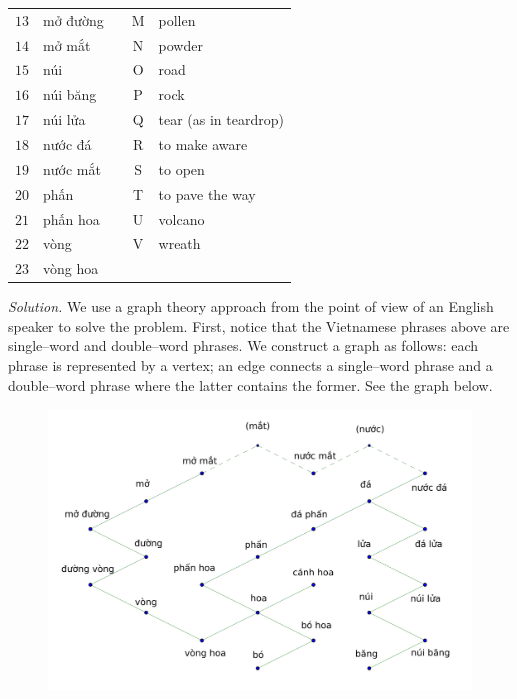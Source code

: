 \begin{multicols}{2}
\begin{table}[H]
{\begin{tabular}{|c|l|c|c|l|}
				$13$ & mở đường   &  & M & pollen                              \\ \cline{1-2} \cline{4-5} 
				$14$ & mở mắt     &  & N & powder                              \\ \cline{1-2} \cline{4-5} 
				$15$ & núi        &  & O & road                                \\ \cline{1-2} \cline{4-5} 
				$16$ & núi băng   &  & P & rock                                \\ \cline{1-2} \cline{4-5} 
				$17$ & núi lửa    &  & Q & tear (as in teardrop)               \\ \cline{1-2} \cline{4-5} 
				$18$ & nước đá    &  & R & to make aware                       \\ \cline{1-2} \cline{4-5} 
				$19$ & nước mắt   &  & S & to open                             \\ \cline{1-2} \cline{4-5} 
				$20$ & phấn       &  & T & to pave the way                     \\ \cline{1-2} \cline{4-5} 
				$21$ & phấn hoa   &  & U & volcano                             \\ \cline{1-2} \cline{4-5} 
				$22$ & vòng       &  & V & wreath                              \\ \cline{1-2} \cline{4-5} 
				$23$ & vòng hoa   &  &   &                                     \\ \cline{1-2} \cline{4-5} 
		\end{tabular}}
		\vspace*{-10pt}
	\end{table}
\textit{Solution.}
We use a graph theory approach from the point of view of an English speaker to solve the problem.
\vskip 0.1cm
First, notice that the Vietnamese phrases above are single--word and double--word phrases.
We construct a graph as follows: each phrase is represented by a vertex; an edge connects a single--word phrase and a double--word phrase where the latter contains the former.  See the graph below.
\begin{figure}[H]
	\vspace*{-5pt}
	\centering
	\captionsetup{labelformat= empty, justification=centering}
	\includegraphics[width= 1\linewidth]{hc-2022-2-2-2-1.pdf}

\end{figure}
\end{multicols}
